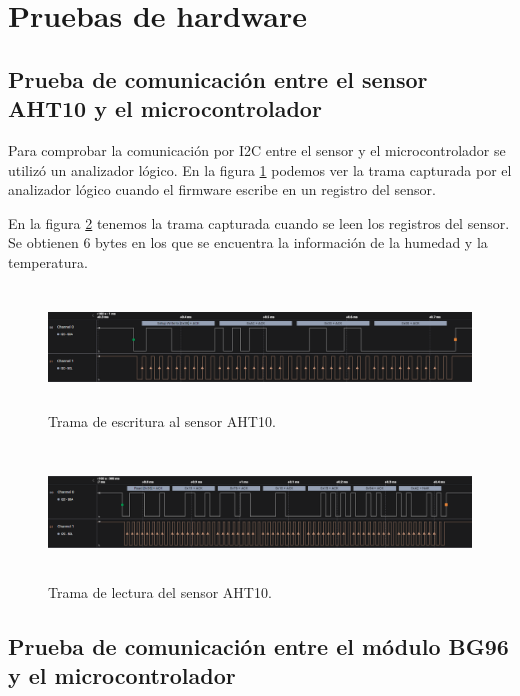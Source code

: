 \section{Pruebas de hardware}
\subsection{Prueba de comunicación entre el sensor AHT10 y el microcontrolador}
Para comprobar la comunicación por I2C entre el sensor y el microcontrolador se utilizó un analizador lógico.
En la figura \ref{fig:write aht10} podemos ver la trama capturada por el analizador lógico cuando el firmware escribe en un registro del sensor. 

En la figura \ref{fig:read aht10} tenemos la trama capturada cuando se leen los registros del sensor. Se obtienen 6 bytes en los que se encuentra la información de la humedad y la temperatura.


\begin{figure}[h!]
  \centering
    \includegraphics[width=\linewidth, height=3.2cm]{./Figures/write_i2c.png}
  \caption{Trama de escritura al sensor AHT10.}
    \label{fig:write aht10}
\end{figure}

\begin{figure}[h!]
  \centering
    \includegraphics[width=\linewidth, height=3.5cm]{./Figures/read_i2c..png}
  \caption{Trama de lectura del sensor AHT10.}
    \label{fig:read aht10}
\end{figure}

\subsection{Prueba de comunicación entre el módulo BG96 y el microcontrolador}

